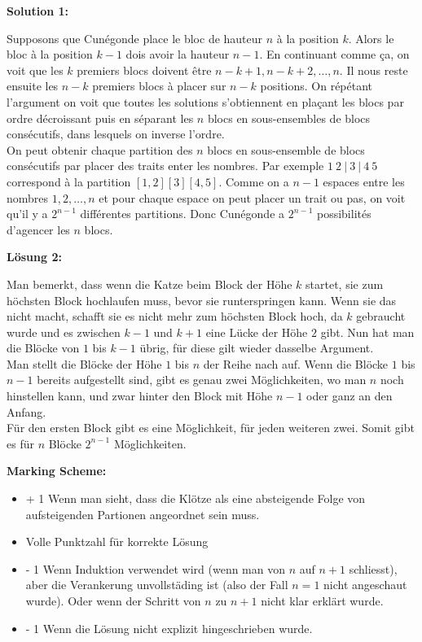 \documentclass[language=german,style=solution]{smo}
\begin{document}
\begin{enumerate}
\textbf{Solution 1:}

Supposons que Cunégonde place le bloc de hauteur $n$ à la position $k$. Alors le bloc à la position $k-1$ dois avoir la hauteur $n-1$. En continuant comme ça, on voit que les $k$ premiers blocs doivent être $n-k+1, n-k+2, \dots , n$. Il nous reste ensuite les $n-k$ premiers blocs à placer sur $n-k$ positions. On répétant l'argument on voit que toutes les solutions s'obtiennent en plaçant les blocs par ordre décroissant puis en séparant les $n$ blocs en sous-ensembles de blocs consécutifs, dans lesquels on inverse l'ordre. \\
On peut obtenir chaque partition des $n$ blocs en sous-ensemble de blocs consécutifs par placer des traits enter les nombres. Par exemple $1 \ 2\ |\ 3 \ |\ 4\ 5$ correspond à la partition $[1,2][3][4,5]$. Comme on a $n-1$ espaces entre les nombres $1,2,\dots,n$ et pour chaque espace on peut placer un trait ou pas, on voit qu'il y a $2^{n-1}$ différentes partitions. Donc Cunégonde a $2^{n-1}$ possibilités d'agencer les $n$ blocs.

\textbf{Lösung 2:}

Man bemerkt, dass wenn die Katze beim Block der Höhe $k$ startet, sie zum höchsten Block hochlaufen muss, bevor sie runterspringen kann. Wenn sie das nicht macht, schafft sie es nicht mehr zum höchsten Block hoch, da $k$ gebraucht wurde und es zwischen $k - 1$ und $k + 1$ eine Lücke der Höhe $2$ gibt. Nun hat man die Blöcke von $1$ bis $k - 1$ übrig, für diese gilt wieder dasselbe Argument.\\  
Man stellt die Blöcke der Höhe $1$ bis $n$ der Reihe nach auf. Wenn die Blöcke $1$ bis $n - 1$ bereits aufgestellt sind, gibt es genau zwei Möglichkeiten, wo man $n$ noch hinstellen kann, und zwar hinter den Block mit Höhe $n - 1$ oder ganz an den Anfang.\\
Für den ersten Block gibt es eine Möglichkeit, für jeden weiteren zwei. Somit gibt es für $n$ Blöcke $2^{n-1}$ Möglichkeiten.

\textbf{Marking Scheme:}

\begin{itemize}
\item + 1 Wenn man sieht, dass die Klötze als eine absteigende Folge von aufsteigenden Partionen angeordnet sein muss.
\item Volle Punktzahl für korrekte Lösung
\item - 1 Wenn Induktion verwendet wird (wenn man von $n$ auf $n+1$ schliesst), aber die Verankerung unvollstäding ist (also der Fall $n = 1$ nicht angeschaut wurde). Oder wenn der Schritt von $n$ zu $n+1$ nicht klar erklärt wurde.
\item - 1 Wenn die Lösung nicht explizit hingeschrieben wurde.
\end{itemize}


\end{enumerate}
\end{document}
